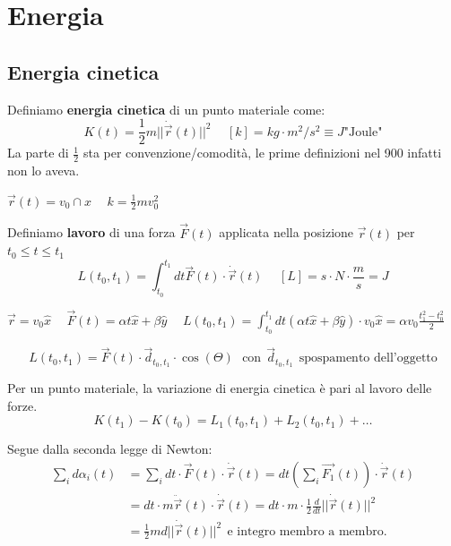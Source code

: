 \newpage
\section{Energia}
\subsection{Energia cinetica}
Definiamo \textbf{energia cinetica} di un punto materiale come:
$$K(t) = \frac{1}{2}m||\dot{\vec{r}}(t)||^2 \hspace{15pt} [k] = kg \cdot m^2/s^2 \equiv J \text{"Joule"}$$
La parte di $\frac{1}{2}$ sta per convenzione/comodità, le prime definizioni nel 900 infatti non lo aveva.
\begin{example}
    $\vec{r}(t) = v_0 \cap{x} \hspace{15pt} k= \frac{1}{2}mv_0^2$
\end{example}
\hspace{-15pt}Definiamo \textbf{lavoro} di una forza $\vec{F}(t)$ applicata nella posizione $\vec{r}(t)$ per $t_0 \leq t \leq t_1$
$$L(t_0, t_1) = \int_{t_0}^{t_1}dt \vec{F}(t) \cdot \dot{\vec{r}}(t) \hspace{15pt} [L] = s \cdot N \cdot \frac{m}{s} = J$$
\begin{example}
    $\vec{r} = v_0 \hat{x} \hspace{15pt} \vec{F}(t) = \alpha t \hat{x} + \beta \hat{y} \hspace{15pt} L(t_0, t_1) = \int_{t_0}^{t_1} dt(\alpha t\hat{x} + \beta \hat{y}) \cdot v_0 \hat{x} = \alpha v_0 \frac{t_1^2 - t_0^2}{2}$
\end{example}
$$L(t_0, t_1) = \vec{F}(t) \cdot \vec{d}_{t_0, t_1} \cdot \cos(\Theta) \:\:\: \text{con} \:\:\vec{d}_{t_0, t_1}\:\:\text{spospamento dell'oggetto}$$
\begin{theorem}
    Per un punto materiale, la variazione di energia cinetica è pari al lavoro delle forze.
    $$K(t_1) - K(t_0) = L_1(t_0, t_1) + L_2(t_0, t_1) + \dots$$
\end{theorem}
\hspace{-15pt}Segue dalla seconda legge di Newton:
\begin{equation*}
    \begin{split}
        \sum_{i} d\alpha_i(t) & = \sum_i dt \cdot \vec{F}(t) \cdot \dot{\vec{r}}(t) = dt (\sum_i \vec{F_1}(t)) \cdot \dot{\vec{r}}(t)\\
                              & = dt \cdot m \ddot{\vec{r}}(t) \cdot \dot{\vec{r}}(t) = dt \cdot m \cdot \frac{1}{2}\frac{d}{dt}||\dot{\vec{r}}(t)||^2\\
                              & = \frac{1}{2}md||\dot{\vec{r}}(t)||^2 \:\: \text{e integro membro a membro.}
    \end{split}
\end{equation*}
